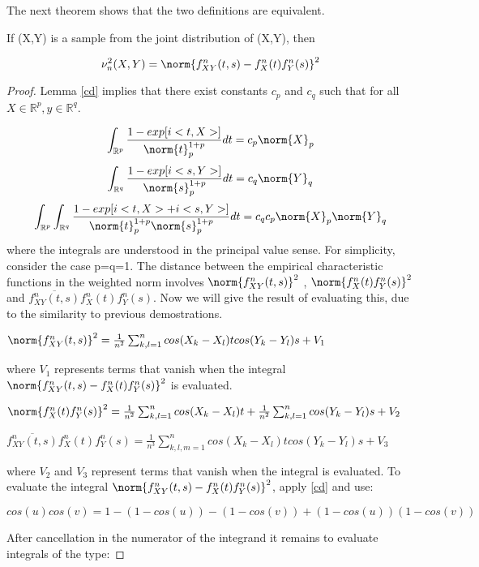 The next theorem shows that the two definitions are equivalent.

\begin{thm}
If (X,Y) is a sample from the joint distribution of (X,Y), then

$$
\nu_{n}^{2}(X,Y) = \norm{f_{XY}^{n}(t,s) - f_{X}^{n}(t)f_{Y}^{n}(s)}^{2}
$$
\end{thm}

\begin{proof}
Lemma \ref{cd} implies that there exist constants $c_{p}$ and $c_{q}$ such that for all $X\in \mathbb{R}^{p}, y\in \mathbb{R}^{q}$.

$$
\int_{\mathbb{R}^{p}}\frac{1- exp[i<t,X>]}{\norm{t}_{p}^{1+p}}dt = c_p\norm{X}_{p}
$$
$$
\int_{\mathbb{R}^{q}}\frac{1- exp[i<s,Y>]}{\norm{s}_{p}^{1+p}}dt = c_q\norm{Y}_{q}\\
$$
$$
\int_{\mathbb{R}^{p}}\int_{\mathbb{R}^{q}}\frac{1- exp[i<t,X>+i<s,Y>]}{\norm{t}_{p}^{1+p}\norm{s}_{p}^{1+p}}dt = c_qc_p\norm{X}_{p}\norm{Y}_{q}
$$
where the integrals are understood in the principal value sense. For simplicity, consider the case p=q=1. The distance between the empirical characteristic functions in the weighted norm involves $\norm{f_{XY}^{n}(t,s)}^{2}$ , $\norm{f_{X}^{n}(t)f_{Y}^{n}(s)}^{2}$ and $\overline{f_{XY}^{n}(t,s)}f_{X}^{n}(t)f_{Y}^{n}(s)$.
Now we will give the result of evaluating this, due to the similarity to previous demostrations.

$\norm{f_{XY}^{n}(t,s)}^{2} = \frac{1}{n^{2}}\sum_{k,l=1}^{n} cos(X_{k}-X_{l})tcos(Y_{k}-Y_{l})s + V_{1}$

where $V_{1}$ represents terms that vanish when the integral $\norm{f_{XY}^{n}(t,s) - f_{X}^{n}(t)f_{Y}^{n}(s)}^{2}$ is evaluated.

$\norm{f_{X}^{n}(t)f_{Y}^{n}(s)}^{2} = \frac{1}{n^{2}}\sum_{k,l=1}^{n} cos(X_{k}-X_{l})t+ \frac{1}{n^{2}}\sum_{k,l=1}^{n}cos(Y_{k}-Y_{l})s + V_{2}$

$\overline{f_{XY}^{n}(t,s)}f_{X}^{n}(t)f_{Y}^{n}(s) = \frac{1}{n^{3}}\sum_{k,l,m=1}^{n} cos(X_{k}-X_{l})tcos(Y_{k}-Y_{l})s + V_{3}$


where $V_{2}$ and $V_{3}$ represent terms that vanish when the integral is evaluated. To evaluate the integral $\norm{f_{XY}^{n}(t,s) - f_{X}^{n}(t)f_{Y}^{n}(s)}^{2}$, apply \ref{cd} and use:

$$
cos(u)cos(v) = 1-(1-cos(u))-(1-cos(v))+(1-cos(u))(1-cos(v))
$$

After cancellation in the numerator of the integrand it remains to evaluate integrals of the type:


\end{proof}
